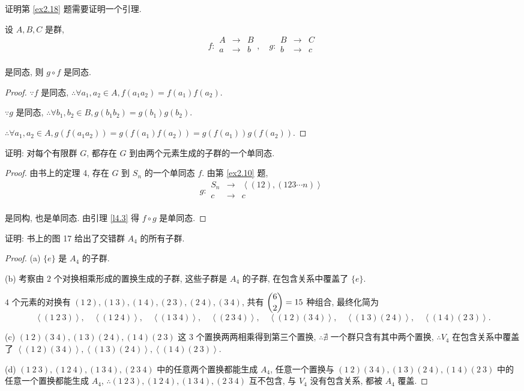 \documentclass[color=black,device=normal,lang=cn,mode=geye]{elegantnote}
\begin{document}
证明第 \ref{ex2.18} 题需要证明一个引理.
\begin{lemma}\label{l4.3}
    设 $A,B,C$ 是群,
    \[f:\begin{array}{rcl}
        A & \to & B \\
        a & \to & b \\
    \end{array},\quad g:\begin{array}{rcl}
        B & \to & C \\
        b & \to & c \\
    \end{array}\]

    是同态, 则 $g\circ f$ 是同态.
\end{lemma}
\begin{proof}
    $\because f$ 是同态, $\therefore\forall a_1,a_2\in A,f(a_1a_2)=f(a_1)f(a_2)$.

    $\because g$ 是同态, $\therefore\forall b_1,b_2\in B,g(b_1b_2)=g(b_1)g(b_2)$.

    $\therefore\forall a_1,a_2\in A,g(f(a_1a_2))=g(f(a_1)f(a_2))=g(f(a_1))g(f(a_2))$.
\end{proof}
\begin{exercise}\label{ex2.18}
    证明: 对每个有限群 $G$, 都存在 $G$ 到由两个元素生成的子群的一个单同态.
\end{exercise}
\begin{proof}
    由书上的定理 4, 存在 $G$ 到 $S_n$ 的一个单同态 $f$. 由第 \ref{ex2.10} 题,
    \[g:\begin{array}{rcl}
        S_n & \to & \left<(12),(123\cdots n)\right> \\
        c & \to & c \\
    \end{array}\]

    是同构, 也是单同态. 由引理 \ref{l4.3} 得 $f\circ g$ 是单同态.
\end{proof}
\begin{exercise}\label{ex2.19}
    证明: 书上的图 17 给出了交错群 $A_4$ 的所有子群.
\end{exercise}
\begin{proof}
    (a) $\{e\}$ 是 $A_4$ 的子群.

    (b) 考察由 $2$ 个对换相乘形成的置换生成的子群, 这些子群是 $A_4$ 的子群, 在包含关系中覆盖了 $\{e\}$.

    $4$ 个元素的对换有 $(1\ 2),(1\ 3),(1\ 4),(2\ 3),(2\ 4),(3\ 4)$, 共有 $\dbinom{6}{2}=15$ 种组合, 最终化简为
    \[\left<(1\ 2\ 3)\right>,\quad\left<(1\ 2\ 4)\right>,\quad\left<(1\ 3\ 4)\right>,\quad\left<(2\ 3\ 4)\right>,\quad\left<(1\ 2)(3\ 4)\right>,\quad\left<(1\ 3)(2\ 4)\right>,\quad\left<(1\ 4)(2\ 3)\right>.\]

    (c) $(1\ 2)(3\ 4),(1\ 3)(2\ 4),(1\ 4)(2\ 3)$ 这 $3$ 个置换两两相乘得到第三个置换, $\therefore\nexists$ 一个群只含有其中两个置换, $\therefore V_4$ 在包含关系中覆盖了 $\left<(1\ 2)(3\ 4)\right>,\left<(1\ 3)(2\ 4)\right>,\left<(1\ 4)(2\ 3)\right>$.

    (d) $(1\ 2\ 3),(1\ 2\ 4),(1\ 3\ 4),(2\ 3\ 4)$ 中的任意两个置换都能生成 $A_4$, 任意一个置换与 $(1\ 2)(3\ 4),(1\ 3)(2\ 4),(1\ 4)(2\ 3)$ 中的任意一个置换都能生成 $A_4$, $\therefore(1\ 2\ 3),(1\ 2\ 4),(1\ 3\ 4),(2\ 3\ 4)$ 互不包含, 与 $V_4$ 没有包含关系, 都被 $A_4$ 覆盖.
\end{proof}
\end{document}
